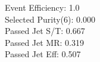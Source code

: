 Event Efficiency:   1.0\\ 
Selected Purity(6): 0.000\\ 
Passed Jet S/T:     0.667\\ 
Passed Jet MR:      0.319\\ 
Passed Jet Eff:     0.507